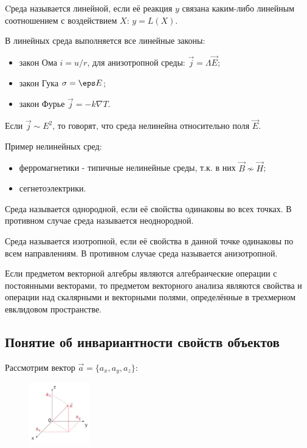     \begin{definition}
        Cреда называется линейной, если её реакция \( y \) связана каким-либо линейным соотношением с воздействием \( X \): \( y = L(X) \).
    \end{definition}
 
    В линейных среда выполняется все линейные законы:
    \begin{itemize}
        \item закон Ома \( i = u/r \), для анизотропной среды: \( \vec{j} = \Lambda \vec{E} \);
        \item закон Гука \( \sigma = \eps E \);
        \item закон Фурье \( \vec{j} = -k \nabla T \).
    \end{itemize}

    Если \( \vec{j} \sim E^2 \), то говорят, что среда нелинейна относительно поля \( \vec{E} \). 

    Пример нелинейных сред:
    \begin{itemize}
        \item ферромагнетики - типичные нелинейные среды, т.к. в них \( \vec{B} \nsim \vec{H} \);
        \item сегнетоэлектрики.
    \end{itemize}
 
    \begin{definition}
        Среда называется однородной, если её свойства одинаковы во всех точках. В противном случае среда называется неоднородной.
    \end{definition}

    \begin{definition}
        Среда называется изотропной, если её свойства в данной точке одинаковы по всем направлениям. В противном случае среда называется анизотропной.
    \end{definition}

    Если предметом векторной алгебры являются алгебраические операции с постоянными векторами, то предметом векторного анализа являются свойства и операции над скалярными и векторными полями, определённые в трехмерном евклидовом пространстве.

\subsection{Понятие об инвариантности свойств объектов}

    Рассмотрим вектор \( \vec{a} = \{a_x, a_y, a_z\} \):
    \begin{figure}[ht]
        \center
        \includegraphics[width=100px]{lec01/vec_a.pdf}
    \end{figure}

